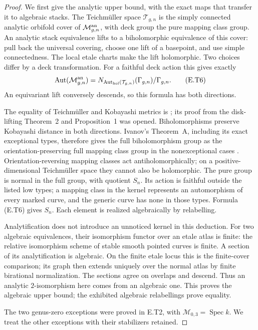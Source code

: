 \begin{proof}
We first give the analytic upper bound, with the exact maps
that transfer it to algebraic stacks.  The Teichm\"uller
space $\mathcal T_{g,n}$ is the simply connected analytic
orbifold cover of $\mathcal M_{g,n}^{\rm an}$, with deck group
the pure mapping class group.  An analytic stack equivalence
lifts to a biholomorphic equivalence of this cover: pull back
the universal covering, choose one lift of a basepoint, and
use simple connectedness.  The local etale charts make the
lift holomorphic.  Two choices differ by a deck transformation.
For a faithful deck action this gives exactly
\[
 \operatorname{Aut}(\mathcal M_{g,n}^{\rm an})
   =N_{\operatorname{Aut}_{\rm hol}(\mathcal T_{g,n})}(\Gamma_{g,n})
      /\Gamma_{g,n}.
 \tag{E.T6}
\]
An equivariant lift conversely descends, so this formula has
both directions.

The equality of Teichm\"uller and Kobayashi metrics is
\cite[Theorem 4, p.~936]{D_EarleKraKrushkal1994}; its proof
from the disk-lifting Theorem~2 and Proposition~1 was opened.
Biholomorphisms preserve Kobayashi distance in both directions.
Ivanov's Theorem~A, including its exact exceptional types,
therefore gives the full biholomorphism group as the
orientation-preserving full mapping class group in the
nonexceptional cases \cite[Theorem A and \S5]{Ivanov2001Royden}.
Orientation-reversing mapping classes act antiholomorphically;
on a positive-dimensional Teichm\"uller space they cannot also
be holomorphic.  The pure group is normal in the full group,
with quotient $S_n$.  Its action is faithful outside the
listed low types; a mapping class in the kernel represents
an automorphism of every marked curve, and the generic
curve has none in those types.  Formula (E.T6) gives $S_n$.
Each element is realized algebraically by relabelling.

Analytification does not introduce an unnoticed kernel in
this deduction.  For two algebraic equivalences, their
isomorphism functor over an etale atlas is finite: the
relative isomorphism scheme of stable smooth pointed curves
is finite.  A section of its analytification is algebraic.
On the finite etale locus this is the finite-cover comparison;
its graph then extends uniquely over the normal atlas by
finite birational normalization.  The sections agree on
overlaps and descend.  Thus an analytic $2$-isomorphism here
comes from an algebraic one.  This proves the algebraic upper
bound; the exhibited algebraic relabellings prove equality.

The two genus-zero exceptions were proved in E.T2, with
$\mathcal M_{0,3}=\operatorname{Spec}k$.  We treat the other
exceptions with their stabilizers retained.


\end{proof}
